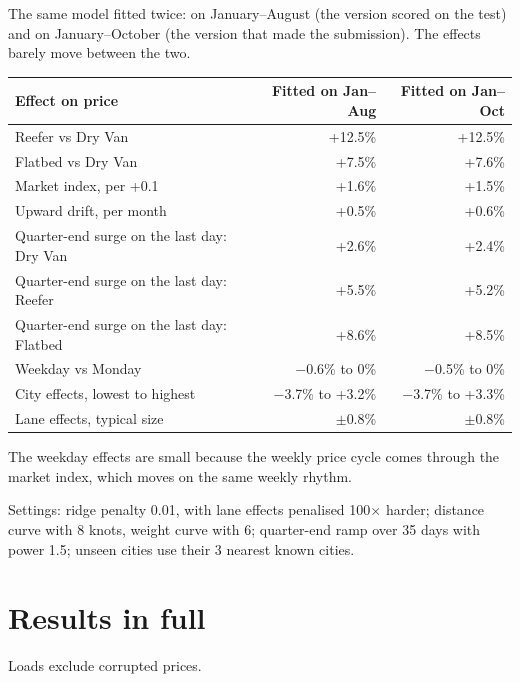 \documentclass[10pt,twocolumn,letterpaper]{article}
\begin{document}
The same model fitted twice: on January--August (the version scored on the test) and on January--October (the version that made the submission). The effects barely move between the two.

\begin{center}
\small
\begin{tabular}{@{}lrr@{}}
  \toprule
  Effect on price & Fitted on Jan--Aug & Fitted on Jan--Oct \\
  \midrule
  Reefer vs Dry Van & +12.5\% & +12.5\% \\
  Flatbed vs Dry Van & +7.5\% & +7.6\% \\
  Market index, per +0.1 & +1.6\% & +1.5\% \\
  Upward drift, per month & +0.5\% & +0.6\% \\
  Quarter-end surge on the last day: Dry Van & +2.6\% & +2.4\% \\
  Quarter-end surge on the last day: Reefer & +5.5\% & +5.2\% \\
  Quarter-end surge on the last day: Flatbed & +8.6\% & +8.5\% \\
  Weekday vs Monday & $-$0.6\% to 0\% & $-$0.5\% to 0\% \\
  City effects, lowest to highest & $-$3.7\% to +3.2\% & $-$3.7\% to +3.3\% \\
  Lane effects, typical size & $\pm$0.8\% & $\pm$0.8\% \\
  \bottomrule
\end{tabular}
\end{center}

The weekday effects are small because the weekly price cycle comes through the market index, which moves on the same weekly rhythm.

Settings: ridge penalty 0.01, with lane effects penalised 100$\times$ harder; distance curve with 8 knots, weight curve with 6; quarter-end ramp over 35 days with power 1.5; unseen cities use their 3 nearest known cities.

\section{Results in full}\label{app:results}

Loads exclude corrupted prices.
\end{document}
